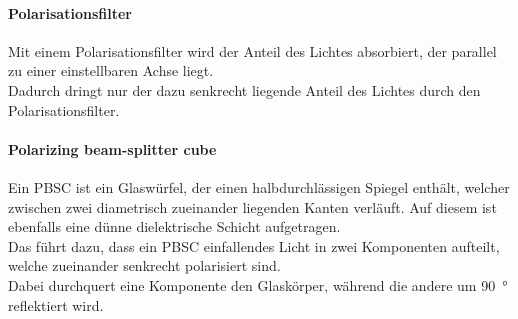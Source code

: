 \paragraph{Polarisationsfilter}
%
Mit einem Polarisationsfilter wird der Anteil des Lichtes 
absorbiert, der parallel zu einer einstellbaren Achse liegt.\\
Dadurch dringt nur der dazu senkrecht liegende Anteil des 
Lichtes durch den Polarisationsfilter.\\
%
\paragraph{Polarizing beam-splitter cube}
Ein PBSC ist ein Glaswürfel, der einen halbdurchlässigen Spiegel 
enthält, welcher zwischen zwei diametrisch zueinander liegenden 
Kanten verläuft. Auf diesem ist ebenfalls eine dünne dielektrische 
Schicht aufgetragen.\\
Das führt dazu, dass ein PBSC einfallendes Licht in zwei 
Komponenten aufteilt, welche zueinander senkrecht polarisiert sind.\\
Dabei durchquert eine Komponente den Glaskörper, während die 
andere um \SI{90}{\degree} reflektiert wird.\\
%

